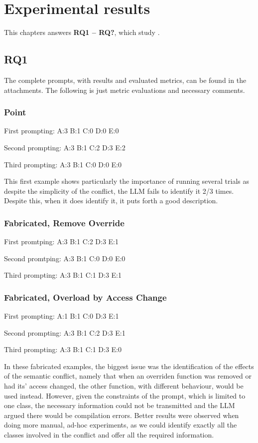 \chapter{Experimental results}\label{chap:results}

This chapters answers \textbf{RQ1 – RQ?}, which study .

\section{RQ1}

The complete prompts, with results and evaluated metrics, can be found in the attachments. The following is just metric evaluations and necessary comments.

\subsection{Point}

First prompting:
A:3
B:1
C:0
D:0
E:0

Second prompting:
A:3
B:1
C:2
D:3
E:2

Third prompting:
A:3
B:1
C:0
D:0
E:0

This first example shows particularly the importance of running several trials as despite the simplicity of the conflict, the LLM fails to identify it 2/3 times. Despite this, when it does identify it, it puts forth a good description.

\subsection{Fabricated, Remove Override}

First promtping:
A:3
B:1
C:2
D:3
E:1


Second promtping:
A:3
B:1
C:0
D:0
E:0


Third prompting:
A:3
B:1
C:1
D:3
E:1

\subsection{Fabricated, Overload by Access Change}
First prompting:
A:1
B:1
C:0
D:3
E:1

Second prompting:
A:3
B:1
C:2
D:3
E:1

Third prompting:
A:3
B:1
C:1
D:3
E:0

In these fabricated examples, the biggest issue was the identification of the effects of the semantic conflict, namely that when an overriden function was removed or had its' access changed, the other function, with different behaviour, would be used instead. However, given the constraints of the prompt, which is limited to one class, the necessary information could not be transmitted and the LLM argued there would be compilation errors. Better results were observed when doing more manual, ad-hoc experiments, as we could identify exactly all the classes involved in the conflict and offer all the required information.

